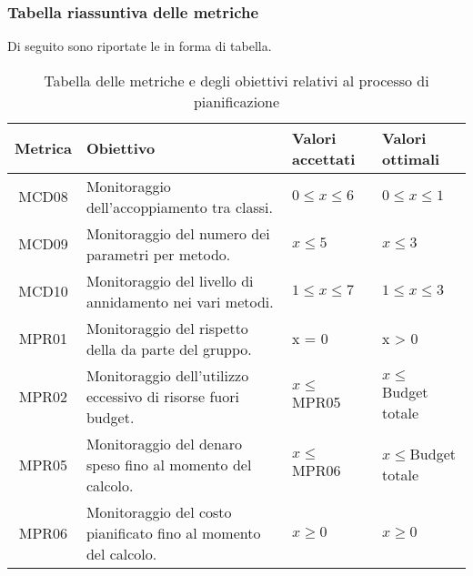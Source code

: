 \subsubsection{Tabella riassuntiva delle metriche}%
Di seguito sono riportate le  in forma di tabella.
\begin{table}[H]
		\begin{center}
			\setlength{\aboverulesep}{0pt}
			\setlength{\belowrulesep}{0pt}
			\setlength{\extrarowheight}{.75ex}
			\begin{tabular}{ c C{6cm} C{3cm} C{3cm} }
				\textbf{Metrica} & \textbf{Obiettivo} & \textbf{Valori accettati} & \textbf{Valori ottimali}  \\
				\toprule
				MCD08 & Monitoraggio dell'accoppiamento tra classi. & $ 0 \leq x \leq 6$ & $ 0 \leq x \leq 1$  \\
				MCD09 & Monitoraggio del numero dei parametri per metodo. & $x \leq 5$ & $x \leq 3 $\\ 
				MCD10 & Monitoraggio del livello di annidamento nei vari metodi. & $1 \leq x \leq 7 $ & $1 \leq x \leq 3$ \\	
				
				MPR01 & Monitoraggio del rispetto della  da parte del gruppo. \gruppo{} & x = 0 & x > 0 \\
				
				MPR02 & Monitoraggio dell'utilizzo eccessivo di risorse fuori budget. & $ x \leq$ MPR05 & $ x \leq$ Budget totale \\
				
				MPR05 & Monitoraggio del denaro speso fino al momento del calcolo. & $ x \leq $ MPR06 & $x \leq $Budget totale  \\
				
				MPR06 & Monitoraggio del costo pianificato fino al momento del calcolo. & $ x \geq 0$ & $x \geq 0$\\		
				

				\bottomrule
			\end{tabular}
			\caption{Tabella delle metriche e degli obiettivi relativi al processo di pianificazione}
		\end{center}
	\end{table}



